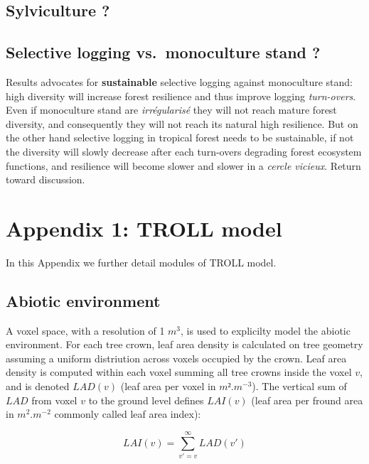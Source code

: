 \documentclass[12pt,]{article}
\let\oldsection\section
\renewcommand\section{\newpage\oldsection}
\theoremstyle{definition}
\theoremstyle{definition}
\theoremstyle{remark}
\begin{document}
\subsection{Sylviculture ?}\label{sylviculture-2}

\subsection{Selective logging vs.~monoculture stand
?}\label{selective-logging-vs.monoculture-stand}

Results advocates for \textbf{sustainable} selective logging against
monoculture stand: high diversity will increase forest resilience and
thus improve logging \emph{turn-overs}. Even if monoculture stand are
\emph{irrégularisé} they will not reach mature forest diversity, and
consequently they will not reach its natural high resilience. But on the
other hand selective logging in tropical forest needs to be sustainable,
if not the diversity will slowly decrease after each turn-overs
degrading forest ecosystem functions, and resilience will become slower
and slower in a \emph{cercle vicieux}. Return toward
\citet{Zimmerman2012} discussion.

\appendix


\hypertarget{appendix-1-troll-model}{\section{Appendix 1: TROLL
model}\label{appendix-1-troll-model}}

In this Appendix we further detail modules of TROLL model.

\subsection{Abiotic environment}\label{abiotic-environment}

A voxel space, with a resolution of 1 \(m^3\), is used to explicilty
model the abiotic environment. For each tree crown, leaf area density is
calculated on tree geometry assuming a uniform distriution across voxels
occupied by the crown. Leaf area density is computed within each voxel
summing all tree crowns inside the voxel \(v\), and is denoted
\(LAD(v)\) (leaf area per voxel in \(m².m^{-3}\)). The vertical sum of
\(LAD\) from voxel \(v\) to the ground level defines \(LAI(v)\) (leaf
area per fround area in \(m^2.m^{-2}\) commonly called leaf area index):

\begin{equation}
  LAI(v) = \sum _{v'=v} ^\infty LAD(v') 
  \label{eq:LAI}
\end{equation}
\end{document}
